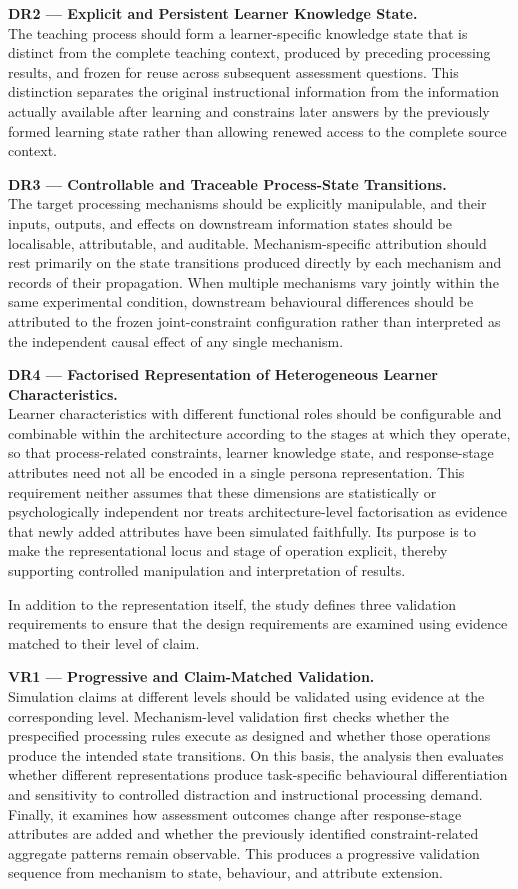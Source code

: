 \textbf{DR2 --- Explicit and Persistent Learner Knowledge State.}\\
The teaching process should form a learner-specific knowledge state that is distinct from the complete teaching context, produced by preceding processing results, and frozen for reuse across subsequent assessment questions. This distinction separates the original instructional information from the information actually available after learning and constrains later answers by the previously formed learning state rather than allowing renewed access to the complete source context.

\textbf{DR3 --- Controllable and Traceable Process-State Transitions.}\\
The target processing mechanisms should be explicitly manipulable, and their inputs, outputs, and effects on downstream information states should be localisable, attributable, and auditable. Mechanism-specific attribution should rest primarily on the state transitions produced directly by each mechanism and records of their propagation. When multiple mechanisms vary jointly within the same experimental condition, downstream behavioural differences should be attributed to the frozen joint-constraint configuration rather than interpreted as the independent causal effect of any single mechanism.

\textbf{DR4 --- Factorised Representation of Heterogeneous Learner Characteristics.}\\
Learner characteristics with different functional roles should be configurable and combinable within the architecture according to the stages at which they operate, so that process-related constraints, learner knowledge state, and response-stage attributes need not all be encoded in a single persona representation. This requirement neither assumes that these dimensions are statistically or psychologically independent nor treats architecture-level factorisation as evidence that newly added attributes have been simulated faithfully. Its purpose is to make the representational locus and stage of operation explicit, thereby supporting controlled manipulation and interpretation of results.

In addition to the representation itself, the study defines three validation requirements to ensure that the design requirements are examined using evidence matched to their level of claim.

\textbf{VR1 --- Progressive and Claim-Matched Validation.}\\
Simulation claims at different levels should be validated using evidence at the corresponding level. Mechanism-level validation first checks whether the prespecified processing rules execute as designed and whether those operations produce the intended state transitions. On this basis, the analysis then evaluates whether different representations produce task-specific behavioural differentiation and sensitivity to controlled distraction and instructional processing demand. Finally, it examines how assessment outcomes change after response-stage attributes are added and whether the previously identified constraint-related aggregate patterns remain observable. This produces a progressive validation sequence from mechanism to state, behaviour, and attribute extension.


